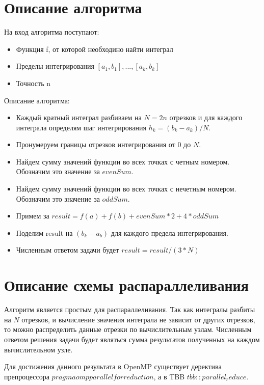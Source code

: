 \documentclass{report}
\begin{document}
\section*{Описание алгоритма}
На вход алгоритма поступают:
\begin{itemize}
\item Функция f, от которой необходино найти интеграл
\item Пределы интегрирования $[a_1,b_1],...,[a_k, b_k]$
\item Точность n
\end{itemize}
\par Описание алгоритма:
\begin{itemize}
\item Каждый кратный интеграл разбиваем на $N=2n$ отрезков и для каждого интеграла определям шаг интегрирования $h_k=(b_k-a_k)/N$.
\item Пронумеруем границы отрезков интегрирования от $0$ до $N$.
\item Найдем сумму значений функции во всех точках с четным номером. Обозначим это значение за $evenSum$.
\item Найдем сумму значений функции во всех точках с нечетным номером. Обозначим это значение за $oddSum$.
\item Примем за $result=f(a)+f(b)+evenSum*2+4*oddSum$
\item Поделим result на $(b_k-a_b)$ для каждого предела интегрирования.
\item Численным ответом задачи будет $result=result/(3*N)$

\end{itemize}

\newpage

\section*{Описание схемы распараллеливания}

Алгоритм является простым для распараллеливания. Так как интегралы разбиты на $N$ отрезков, и вычисление значения интеграла не зависит от других отрезков, то можно распределить данные отрезки по вычислительным узлам. Численным ответом решения задачи будет являться сумма результатов полученных на каждом вычислительном узле. 
\par Для достижения данного результата в OpenMP существует деректива препроцессора $pragma omp parallel for reduction$, а в TBB $tbb::parallel_reduce$.
\newpage
\end{document}
